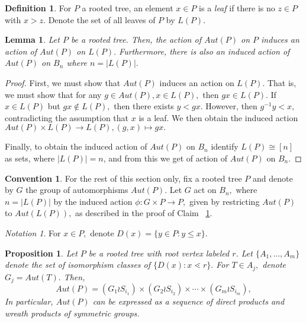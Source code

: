 \documentclass[10 pt]{amsart}
\theoremstyle{plain}
\newtheorem{prop}[thm]{Proposition}
\newtheorem{lem}[thm]{Lemma}
\theoremstyle{definition}
\newtheorem{defn}[thm]{Definition}
\newtheorem{convention}[thm]{Convention}
\theoremstyle{remark}
\newtheorem{note}[thm]{Notation}
\numberwithin{equation}{section}
\begin{document}
\begin{defn}
For $P$ a rooted tree, an element $x \in P$ is a {\it leaf} if there is no $z \in P$ with $x > z.$ Denote the set of all leaves of $P$ by $L(P).$
\end{defn}

\begin{lem}
\label{lem:induced_tree_action}
Let $P$ be a rooted tree. Then, the action of $Aut(P)$ on $P$ induces an action of $Aut(P)$ on $L(P).$ Furthermore, there is also an induced action of $Aut(P)$ on $B_n$ where $n = |L(P)|.$ 
\end{lem}
\begin{proof}
First, we must show that $Aut(P)$ induces an action on $L(P).$ That is, we must show that for any $g \in Aut(P),x \in L(P),$ then $gx \in L(P).$ If $x \in L(P)$ but $gx \notin L(P),$ then there exists $y < gx.$ However, then $g^{-1}y < x,$ contradicting the assumption that $x$ is a leaf. We then obtain the induced action $Aut(P)\times L(P) \rightarrow L(P),(g,x)\mapsto gx.$

Finally, to obtain the induced action of $Aut(P)$ on $B_n$ identify $L(P) \cong [n]$ as sets, where $|L(P)| = n$, and from this we get of action of $Aut(P)$ on $B_n.$
\end{proof}

\begin{convention}
For the rest of this section only, fix a rooted tree $P$ and denote by $G$ the group of automorphisms $Aut(P).$ Let $G$ act on $B_n,$ where $n = |L(P)|$ by the induced action $\phi:G \times P \rightarrow P,$ given by restricting $Aut(P)$ to $Aut(L(P)),$ as described in the proof of Claim ~\ref{lem:induced_tree_action}.
\end{convention}

\begin{note}
For $x \in P,$ denote $D(x) = \{y \in P: y \leq x\}.$
\end{note}
\begin{prop}
\label{prop:automorphism_trees}
Let $P$ be a rooted tree with root vertex labeled $r$. Let $\{A_1,\ldots,A_m\}$ denote the set of isomorphism classes of $\{D(x):x\lessdot r\}.$ For $T \in A_j,$ denote $G_j = Aut(T).$ Then, 
\begin{equation}
\label{eq:level_expansion}
Aut(P) = (G_1 \wr S_{i_1}) \times (G_2 \wr S_{i_2}) \times \cdots \times (G_m\wr S_{i_m}),
\end{equation}
In particular, $Aut(P)$ can be expressed as a sequence of direct products and wreath products of symmetric groups.
\end{prop}
\end{document}
